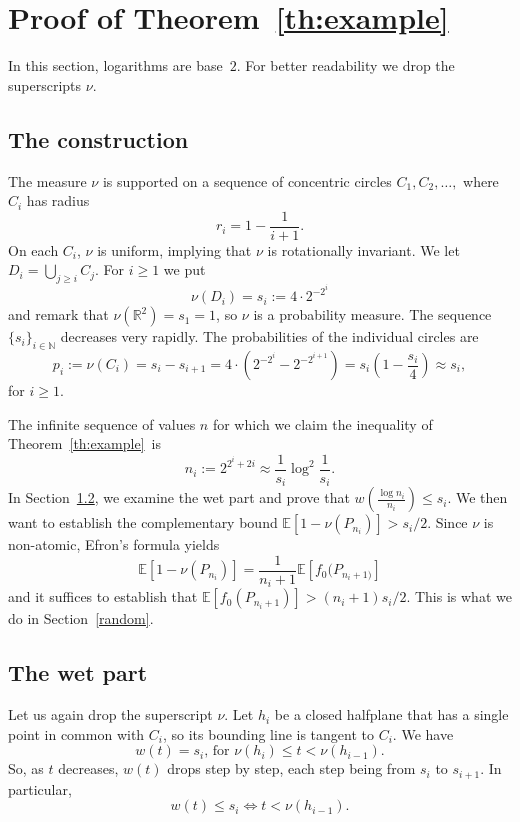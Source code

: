 \documentclass[10pt]{amsart}
\theoremstyle{definition}\newtheorem{defi}[theo]{Definition}\newtheorem{rema}[theo]{Remark}\newtheorem{exam}[theo]{Example}\newtheorem{exem}[theo]{Example}\newtheorem{nota}[theo]{Notation}
\newcommand{\wet}[1]{w(#1)}
\newcommand{\Nbb}{\mathbb{N}}%
\newcommand{\Rbb}{\mathbb{R}}%
\newcommand{\Ebb}{\mathbb{E}}%
\newcommand{\pth}[1]{\left(#1 \right)}
\newcommand{\ptb}[1]{\left[#1 \right]}
\newcommand*{\mtfrac}[2]{\frac{#1}{#2}}%
\begin{document}
\section{Proof of Theorem~\ref{th:example}}\label{sec:example}

In this section, logarithms are base~$2$. For better readability we drop the superscripts $\nu$.

\subsection{The construction}

The measure $\nu$ is supported on a sequence of concentric circles $C_1, C_2, \dots,$ where $C_i$ has radius
\[
r_i=1-\frac1{i+1}.
\]
On each $C_i$, $\nu$ is uniform, implying that $\nu$ is rotationally invariant. We let $D_i=\bigcup_{j \ge i} C_j$. For $i \ge 1$ we put
\[
\nu(D_i)= s_i := 4 \cdot 2^{-2^i}
\]
and remark that $\nu(\Rbb^2) = s_1 = 1$, so $\nu$ is a probability measure. The sequence $\{s_i\}_{i \in \Nbb}$ decreases very rapidly. The probabilities of the individual circles are
\[
p_i:=\nu(C_i)=s_i-s_{i+1}=4\cdot\pth{2^{-2^i}-2^{-2^{i+1}}} =s_i\pth{1-\frac{s_i}4}\approx s_i,
\]
for $i\ge1$.

The infinite sequence of values $n$ for which we claim the inequality of Theorem~\ref{th:example}~is
\[
n_i :=2^{2^i+2i} \approx \mtfrac 1{s_i} \log^2 \mtfrac 1{s_i}.
\]
In Section~\ref{wet}, we examine the wet part and prove that $\wet{\mtfrac{\log n_i}{n_i}}\le s_i$. We then want to establish the complementary bound $\Ebb\ptb{1-\nu(P_{n_i})}> s_i/2$. Since $\nu$ is non-atomic, Efron's formula yields
\[
\Ebb\ptb{1-\nu(P_{n_i })} = \frac1{n_i+1} \Ebb\ptb{f_0(P_{n_i+1)}}
\]
and it suffices to establish that $\Ebb\ptb{f_0(P_{n_i+1})} > (n_i+1) s_i/2$. This is what we do in Section~\ref{random}.



\subsection{The wet part}\label{wet}

Let us again drop the superscript $\nu$. Let $h_i$ be a closed halfplane that has a single point in common with $C_i$, so its bounding line is tangent to $C_i$. We have
\[
\wet{t}=s_{i} \text{, \ for } \nu(h_{i}) \le t < \nu(h_{i-1}).
\]
So, as $t$ decreases, $\wet t$ drops step by step, each step being from $s_i$ to $s_{i+1}$. In particular,
\begin{equation}\label{eq:drops-one}
\wet {t}\le s_{i} \iff t< \nu(h_{i-1}).
\end{equation}
\end{document}
